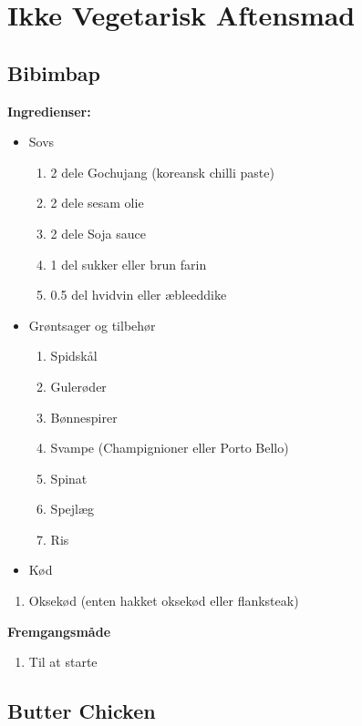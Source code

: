 \documentclass{book}
\begin{document}
{\chapter{Ikke Vegetarisk Aftensmad} 
\minitoc
\newpage \section{Bibimbap}
\begin{minipage}[t]{0.5\textwidth}
    \textbf{Ingredienser:}
    \begin{itemize}
        \item Sovs
        \begin{enumerate}
            \item 2 dele Gochujang (koreansk chilli paste)
            \item 2 dele sesam olie 
            \item 2 dele Soja sauce
            \item 1 del sukker eller brun farin
            \item 0.5 del hvidvin eller æbleeddike
        \end{enumerate}
        \item Grøntsager og tilbehør
        \begin{enumerate}
            \item Spidskål
            \item Gulerøder
            \item Bønnespirer 
            \item Svampe (Champignioner eller Porto Bello)
            \item Spinat 
            \item Spejlæg
            \item Ris
        \end{enumerate}
    
        \item Kød
    \end{itemize}
        \begin{enumerate}
            \item Oksekød (enten hakket oksekød eller flanksteak)
        \end{enumerate}
\end{minipage}
\begin{minipage}[t]{0.5\textwidth}
\textbf{Fremgangsmåde}    
\begin{enumerate}
    \item Til at starte
\end{enumerate}
\end{minipage}
\newpage \section{Butter Chicken}
\begin{minipage}[t]{0.5\textwidth}
\end{minipage}
\begin{minipage}[t]{0.5\textwidth}
\end{minipage}
}
\end{document}
